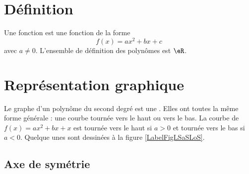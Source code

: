 


\section{Définition}

\begin{definition}
    Une fonction  est une fonction de la forme
    \begin{equation}
        f(x)=ax^2+bx+c
    \end{equation}
    avec \( a\neq 0\). L'ensemble de définition des polynômes est \( \eR\).
\end{definition}

\section{Représentation graphique}

\newcommand{\CaptionFigLSaSLoS}{Quelque paraboles.}


Le graphe d'un polynôme du second degré est une . Elles ont toutes la même forme générale : une courbe tournée vers le haut ou vers le bas. La courbe de \( f(x)=ax^2+bx+x\) est tournée vers le haut si \( a>0\) et tournée vers le bas si \( a<0\).
Quelque unes sont dessinées à la figure \ref{LabelFigLSaSLoS}. %

\subsection{Axe de symétrie}

